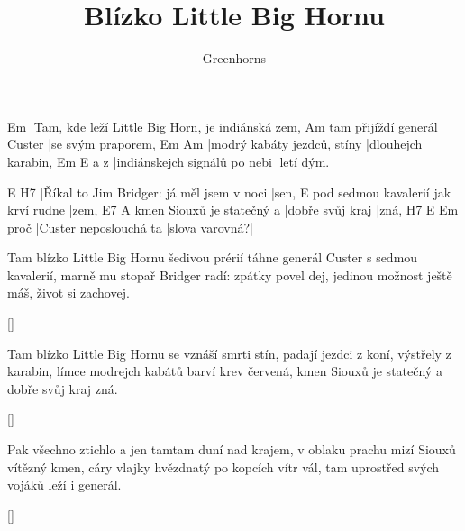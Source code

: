 \documentclass{song}
\title{Blízko Little Big Hornu}
\author{Greenhorns}
\begin{document}
\strophe
Em
|Tam, kde leží Little Big Horn, je indiánská zem,
                            Am
tam přijíždí generál Custer |se svým praporem,
Em                          Am
|modrý kabáty jezdců, stíny |dlouhejch karabin,
    Em                            E
a z |indiánskejch signálů po nebi |letí dým.
\endstrophe

E                                         H7
|Říkal to Jim Bridger: já měl jsem v noci |sen,
                                    E
pod sedmou kavalerií jak krví rudne |zem,
                          E7               A
kmen Siouxů je statečný a |dobře svůj kraj |zná,
     H7                     E              Em
proč |Custer neposlouchá ta |slova varovná?|
\endstrophe

\strophe*
Tam blízko Little Big Hornu šedivou prérií
táhne generál Custer s sedmou kavalerií,
marně mu stopař Bridger radí: zpátky povel dej,
jedinou možnost ještě máš, život si zachovej.
\endstrophe

\ref{}

\strophe*
Tam blízko Little Big Hornu se vznáší smrti stín,
padají jezdci z koní, výstřely z karabin,
límce modrejch kabátů barví krev červená,
kmen Siouxů je statečný a dobře svůj kraj zná.
\endstrophe

\ref{}

\strophe*
Pak všechno ztichlo a jen tamtam duní nad krajem,
v oblaku prachu mizí Siouxů vítězný kmen,
cáry vlajky hvězdnatý po kopcích vítr vál,
tam uprostřed svých vojáků leží i generál.
\endstrophe

\ref{}
\end{document}
